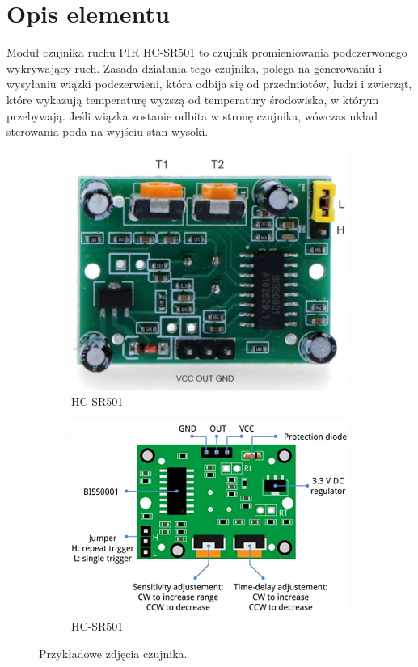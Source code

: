 \documentclass[11pt, a4paper]{article}
\author{Adam Rewekant}
\institute{Instytut Robotyki i Inteligencji Maszynowej}
\begin{document}

\newpage
\section*{Opis elementu} 
Moduł czujnika ruchu PIR HC-SR501 to czujnik promieniowania podczerwonego wykrywający ruch. Zasada działania tego czujnika, polega na generowaniu i wysyłaniu wiązki podczerwieni, która odbija się od przedmiotów, ludzi i zwierząt, które wykazują temperaturę wyższą od temperatury środowiska, w którym przebywają. Jeśli wiązka zostanie odbita w stronę czujnika, wówczas układ sterowania poda na wyjściu stan wysoki. 



\vspace{0.5cm}
\begin{figure}[h]
\centering
\begin{subfigure}{.5\textwidth}
  \centering
  \includegraphics[width=.6\linewidth]{fig/element/fot1.png}
  \caption{HC-SR501 \cite{fot1}}
  \label{fig:sub1}
\end{subfigure}%
\begin{subfigure}{.5\textwidth}
  \centering
  \includegraphics[width=.8\linewidth]{fig/element/fot2.png}
  \caption{HC-SR501 \cite{fot2}}
  \label{fig:sub2}
\end{subfigure}
\caption{Przykładowe zdjęcia czujnika.}
\label{fig:test}
\end{figure}
\vspace{0.5cm}
\end{document}
